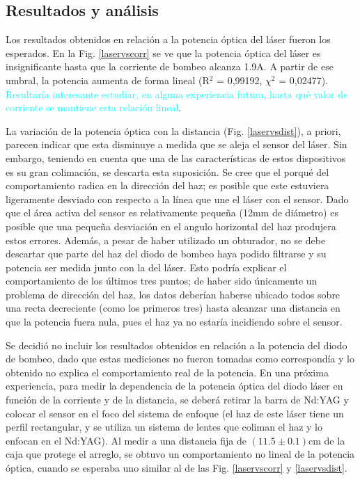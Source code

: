 \documentclass[10pt, a4paper]{article}%
\begin{document}
\begin{multicols}{2}

\section*{Resultados y análisis}
Los resultados obtenidos en relación a la potencia óptica del láser fueron los esperados. En la Fig. \ref{laservscorr} se ve que la potencia óptica del láser es insignificante hasta que la corriente de bombeo alcanza 1.9A. A partir de ese umbral, la potencia aumenta de forma lineal  (R$^2$ = 0,99192, $\chi^2$ = 0,02477). %
\textcolor{cyan}{Resultaría interesante estudiar, en alguna experiencia futura, hasta qué valor de corriente se mantiene esta relación lineal}. 

La variación de la potencia óptica con la distancia (Fig. \ref{laservsdist}), a priori, parecen indicar que esta disminuye a medida que se aleja el sensor del láser. Sin embargo, teniendo en cuenta que una de las características de estos dispositivos es su gran colimación, se descarta esta suposición. Se cree que el porqué del comportamiento radica en la dirección del haz; es posible que este estuviera ligeramente desviado con respecto a la línea que une el láser con el sensor. Dado que el área activa del sensor es relativamente pequeña (12mm de diámetro) es posible que una pequeña desviación en el angulo horizontal del haz produjera estos errores. 
Además, a pesar de haber utilizado un obturador, no se debe descartar que parte del haz del diodo de bombeo haya podido filtrarse y su potencia ser medida junto con la del láser. Esto podría explicar el comportamiento de los últimos tres puntos; de haber sido únicamente un problema de dirección del haz, los datos deberían haberse ubicado todos sobre una recta decreciente (como los primeros tres) hasta alcanzar una distancia en que la potencia fuera nula, pues el haz ya no estaría incidiendo sobre el sensor. 

Se decidió no incluir los resultados obtenidos en relación a la potencia del diodo de bombeo, dado que estas mediciones no fueron tomadas como correspondía y lo obtenido no explica el comportamiento real de la potencia. En una próxima experiencia, para medir la dependencia de la potencia óptica del diodo láser en función de la corriente y de la distancia, se deberá retirar la barra de Nd:YAG y colocar el sensor en el foco del sistema de enfoque (el haz de este láser tiene un perfil rectangular, y se utiliza un sistema de lentes que coliman el haz y lo enfocan en el Nd:YAG). Al medir a una distancia fija de $(11.5 \pm 0.1)$cm de la caja que protege el arreglo, se obtuvo un comportamiento no lineal de la potencia óptica, cuando se esperaba uno similar al de las Fig. \ref{laservscorr} y \ref{laservsdist}.


\end{multicols}
\end{document}
